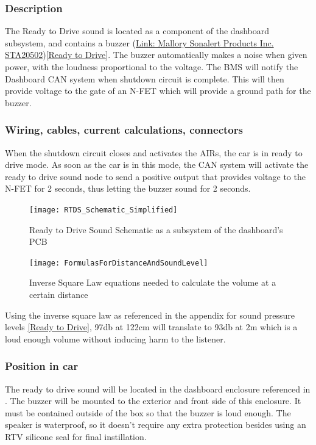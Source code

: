 \documentclass{article}
\begin{document}
\subsubsection{Description}
The Ready to Drive sound is located as a component of the dashboard subsystem, and contains a buzzer (\href{http://www.mallory-sonalert.com/specifications/STA20502.PDF}{Link: Mallory Sonalert Products Inc. STA20502})\ref{Ready to Drive}. The buzzer automatically makes a noise when given power, with the loudness proportional
to the voltage. The BMS will notify the Dashboard CAN system when shutdown circuit is complete. This will then provide voltage to the gate of an N-FET which will provide a ground path for the buzzer.
\subsubsection{Wiring, cables, current calculations, connectors}
When the shutdown circuit closes and activates the AIRs, the car is in ready to drive mode. As soon as the
car is in this mode, the CAN system will activate the ready to drive sound node to send a positive output
that provides voltage to the N-FET for 2 seconds, thus letting the buzzer sound for 2 seconds. 


\begin{figure}[h]
	\texttt{[image: RTDS\_Schematic\_Simplified]}
	\caption{Ready to Drive Sound Schematic as a subsystem of the dashboard's PCB}
\end{figure}
\begin{figure}[H]
	\texttt{[image: FormulasForDistanceAndSoundLevel]}
	\caption{Inverse Square Law equations needed to calculate the volume at a certain distance}
\end{figure}
Using the inverse square law as referenced in the appendix  for sound pressure levels \ref{Ready to Drive}, 97db at 122cm will translate to 93db at 2m which is a loud enough volume without inducing harm to the listener. 
\subsubsection{Position in car}
The ready to drive sound will be located in the dashboard enclosure referenced in . The buzzer will be mounted
to the exterior and front side of this enclosure. It must be contained outside of the box so that the buzzer is
loud enough. The speaker is waterproof, so it doesn't require any extra protection besides using an RTV silicone seal for final instillation. 
\end{document}
